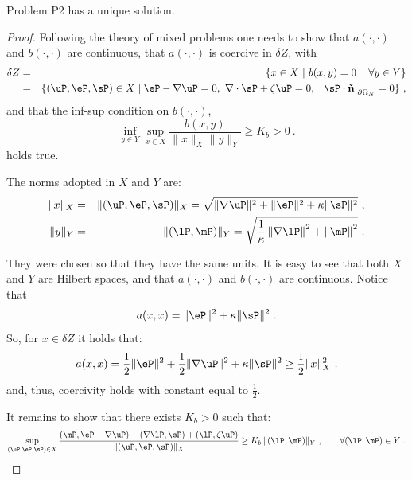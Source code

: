 \begin{theorem}[Uniqueness]
	Problem P2 has a unique solution.
	
	\begin{proof}
		Following the theory of mixed problems \cite{brezzi-fortin,ern-guermond} one needs to show that $a(\cdot,\cdot)$ and $b(\cdot,\cdot)$ are continuous, that $a(\cdot,\cdot)$ is coercive in $\delta Z$, with
		\begin{eqnarray}
			\delta Z&=&\{x\in X~|~b(x,y)=0\, \quad \forall y\in Y\}\nonumber \\
			&=&\{(\uP,\eP,\sP)\in X \mid \eP-\nabla \uP=0, ~\nabla \cdot \sP + \zeta \uP =0,~\left. ~\sP \cdot \mathbf{\check{n}}\right |_{\partial\Omega_N} = 0  \}~,
		\end{eqnarray}
		and that the inf-sup condition on $b(\cdot,\cdot)$,
		\begin{equation}
			\inf_{y\in Y}\sup_{x\in X} \frac{b(x,y)}{\|x\|_X\|y\|_Y} \geq K_b > 0~.
		\end{equation}
		holds true.
		
		The norms adopted in $X$ and $Y$ are: 
		\begin{eqnarray}
			\|x\|_X &=& \|(\uP,\eP,\sP)\|_X = \sqrt{\|\nabla \uP\|^2+\|\eP\|^2+\kappa \|\sP\|^2}~,\\
			\|y\|_Y &=& \|(\lP,\mP)\|_Y=\sqrt{\frac{1}{\kappa}\left \| \nabla \lP \right \|^2+\left\|\mP \right \|^2}~.
		\end{eqnarray}
		
		They were chosen so that they have the same units. It is easy to see that both $X$ and $Y$ are Hilbert spaces, and that $a(\cdot,\cdot)$ and $b(\cdot,\cdot)$ are continuous. Notice that
		\begin{equation*}
				a(x,x)=\|\eP\|^2 + \kappa \|\sP\|^2 ~.
		\end{equation*}
		So, for $x \in \delta Z$ it holds that:
		\begin{equation*}
			a(x,x)= \frac12 \|\eP\|^2 +\frac12 \|\nabla \uP\|^2+ \kappa \|\sP\|^2 \geq \frac12 \|x\|_X^2~.
		\end{equation*}
		and, thus, coercivity holds with constant equal to $\frac12$.
		
		It remains to show that there exists $K_b>0$ such that:
		\begin{equation*}
			\sup_{(\uP,\eP,\sP)\in X} \frac{\left (\mP,\eP-\nabla \uP \right ) - \left (\nabla \lP, \sP \right ) + \left ( \lP, \zeta \uP \right )}{\|(\uP,\eP,\sP)\|_X} \geq K_b \, \|(\lP,\mP)\|_{Y}~, \qquad \forall (\lP,\mP)\in Y~.
		\end{equation*}
	

\end{proof}
\end{theorem}
